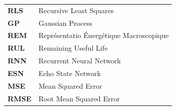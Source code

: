 \documentclass[a4paper,french,12pt,twoside,openright]{book}
\begin{document}
\begin{longtable}{ll}
\textbf{RLS}    & Recursive Least Squares \\
\textbf{GP}     & Gaussian Process \\
\textbf{REM}    & Représentatio Énergétique Macroscopique \\
\textbf{RUL}    & Remaining Useful Life  \\
\textbf{RNN}    & Recurrent Neural Network \\ 
\textbf{ESN}    & Echo State Network \\
\textbf{MSE}    & Mean Squared Error \\
\textbf{RMSE}   & Root Mean Squared Error \\
\end{longtable}
\vspace{1cm} %
\newpage
   
\newpage

\newpage

\newpage

\newpage
%

\end{document}
